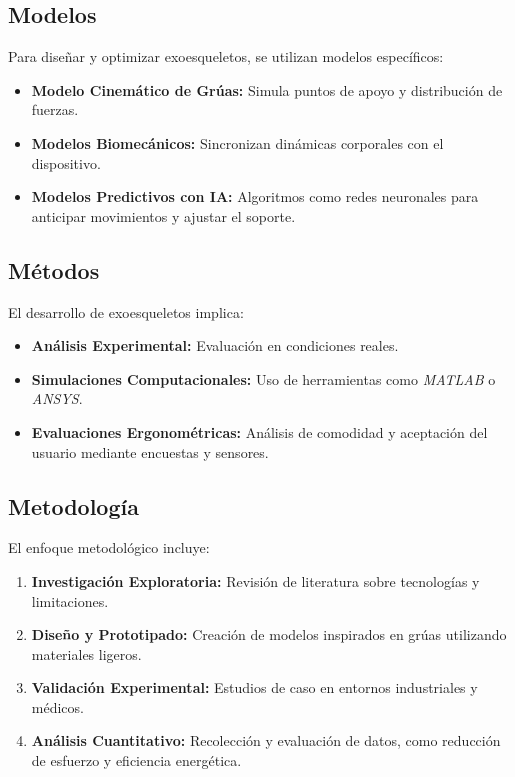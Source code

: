 \subsection{Modelos}
Para diseñar y optimizar exoesqueletos, se utilizan modelos específicos:
\begin{itemize}
    \item \textbf{Modelo Cinemático de Grúas:} Simula puntos de apoyo y distribución de fuerzas.
    \item \textbf{Modelos Biomecánicos:} Sincronizan dinámicas corporales con el dispositivo.
    \item \textbf{Modelos Predictivos con IA:} Algoritmos como redes neuronales para anticipar movimientos y ajustar el soporte.
\end{itemize}

\subsection{Métodos}
El desarrollo de exoesqueletos implica:
\begin{itemize}
    \item \textbf{Análisis Experimental:} Evaluación en condiciones reales.
    \item \textbf{Simulaciones Computacionales:} Uso de herramientas como \textit{MATLAB} o \textit{ANSYS}.
    \item \textbf{Evaluaciones Ergonométricas:} Análisis de comodidad y aceptación del usuario mediante encuestas y sensores.
\end{itemize}

\subsection{Metodología}
El enfoque metodológico incluye:
\begin{enumerate}
    \item \textbf{Investigación Exploratoria:} Revisión de literatura sobre tecnologías y limitaciones.
    \item \textbf{Diseño y Prototipado:} Creación de modelos inspirados en grúas utilizando materiales ligeros.
    \item \textbf{Validación Experimental:} Estudios de caso en entornos industriales y médicos.
    \item \textbf{Análisis Cuantitativo:} Recolección y evaluación de datos, como reducción de esfuerzo y eficiencia energética.
\end{enumerate}

